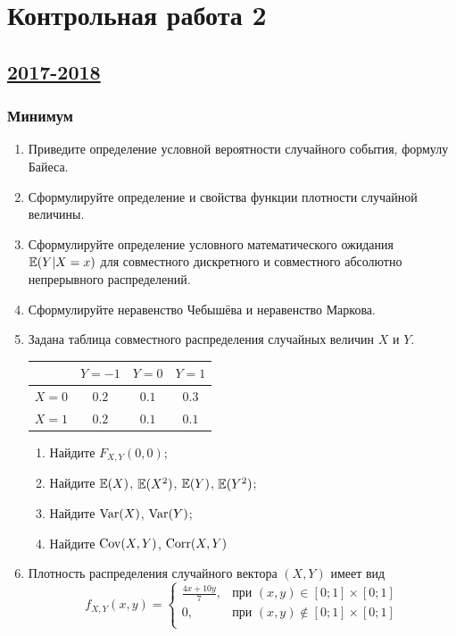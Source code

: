 \newpage
\thispagestyle{empty}
\section{Контрольная работа 2}



\subsection[2017-2018]{\hyperref[sec:sol_kr_02_2017_2018]{2017-2018}}
\label{sec:kr_02_2017_2018}

\subsubsection*{Минимум}

\begin{enumerate}
\item Приведите определение условной вероятности случайного события, формулу Байеса.
\item Сформулируйте определение и свойства функции плотности случайной величины.
\item Сформулируйте определение  условного математического ожидания $\operatorname{\mathbb{E}}(Y|X=x)$ для совместного дискретного и совместного абсолютно непрерывного распределений.
\item Сформулируйте неравенство Чебышёва и неравенство Маркова.

\item Задана таблица совместного распределения случайных величин $X$ и $Y$.
\begin{center}
\begin{tabular}{lccc}
\toprule
                       & $Y=-1$  & $Y=0$   & $Y=1$   \\
 \midrule
$X=0$                 & $0.2$ & $0.1$ & $0.3$ \\
 $X=1$                 & $0.2$ & $0.1$ & $0.1$ \\
 \bottomrule
\end{tabular}
\end{center}


\begin{enumerate}
    \item Найдите $F_{X,Y}(0, 0)$;
    \item Найдите $\operatorname{\mathbb{E}}(X)$, $\operatorname{\mathbb{E}}(X^2)$, $\operatorname{\mathbb{E}}(Y)$, $\operatorname{\mathbb{E}}(Y^2)$;
    \item Найдите $\operatorname{Var}(X)$, $\operatorname{Var}(Y)$;
    \item Найдите $\operatorname{Cov}(X, Y)$, $\operatorname{Corr}(X, Y)$
\end{enumerate}
\item Плотность распределения случайного вектора $(X,Y)$ имеет вид
\[
f_{X,Y}(x,y) =
\begin{cases}
\frac{4x+10y}{7}, & \text{при } (x,y) \in [0;1] \times [0;1] \\
0 , & \text{при } (x,y) \not\in [0;1] \times [0;1] \\
\end{cases}
\]


\end{enumerate}

